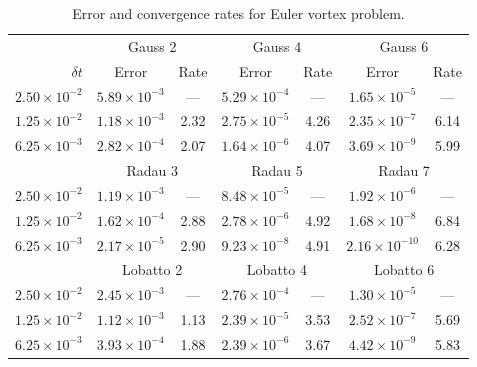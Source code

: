 \documentclass[review]{siamart}
\begin{document}
\begin{table}
	\centering
	\caption{Error and convergence rates for Euler vortex problem.}
	\label{tab:ev-errors}
	\begin{tabular}{r|cccccc}
		\toprule
		& \multicolumn{2}{c}{Gauss 2} & \multicolumn{2}{c}{Gauss 4} & \multicolumn{2}{c}{Gauss 6}\\
		$\delta t$ & Error & Rate & Error & Rate & Error & Rate\\
		\midrule
		$2.50\times 10^{-2}$ & $5.89 \times 10^{-3}$ & --- & $5.29 \times 10^{-4}$ & --- & $1.65 \times 10^{-5}$ & --- \\
		$1.25\times 10^{-2}$ & $1.18 \times 10^{-3}$ & 2.32 & $2.75 \times 10^{-5}$ & 4.26 & $2.35 \times 10^{-7}$ & 6.14 \\
		$6.25\times 10^{-3}$ & $2.82 \times 10^{-4}$ & 2.07 & $1.64 \times 10^{-6}$ & 4.07 & $3.69 \times 10^{-9}$ & 5.99 \\
		\midrule
		& \multicolumn{2}{c}{Radau 3} & \multicolumn{2}{c}{Radau 5} & \multicolumn{2}{c}{Radau 7}\\
		\midrule
		$2.50\times 10^{-2}$ & $1.19 \times 10^{-3}$ & --- & $8.48 \times 10^{-5}$ & --- & $1.92 \times 10^{-6}$ & --- \\
		$1.25\times 10^{-2}$ & $1.62 \times 10^{-4}$ & 2.88 & $2.78 \times 10^{-6}$ & 4.92 & $1.68 \times 10^{-8}$ & 6.84 \\
		$6.25\times 10^{-3}$ & $2.17 \times 10^{-5}$ & 2.90 & $9.23 \times 10^{-8}$ & 4.91 & $2.16 \times 10^{-10}$ & 6.28 \\
		\midrule
		& \multicolumn{2}{c}{Lobatto 2} & \multicolumn{2}{c}{Lobatto 4} & \multicolumn{2}{c}{Lobatto 6}\\
		\midrule
		$2.50\times 10^{-2}$ & $2.45 \times 10^{-3}$ & --- & $2.76 \times 10^{-4}$ & --- & $1.30 \times 10^{-5}$ & --- \\
		$1.25\times 10^{-2}$ & $1.12 \times 10^{-3}$ & 1.13 & $2.39 \times 10^{-5}$ & 3.53 & $2.52 \times 10^{-7}$ & 5.69 \\
		$6.25\times 10^{-3}$ & $3.93 \times 10^{-4}$ & 1.88 & $2.39 \times 10^{-6}$ & 3.67 & $4.42 \times 10^{-9}$ & 5.83 \\
		\bottomrule
	\end{tabular}
\end{table}
\end{document}
